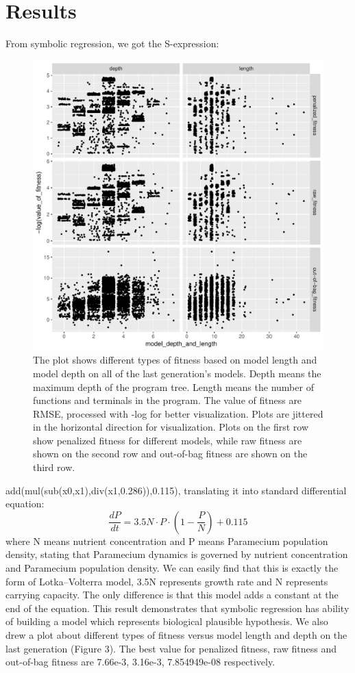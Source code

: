 \documentclass[11pt,a4paper]{article}
\begin{document}
\section{Results}
From symbolic regression, we got the S-expression:
\begin{figure}[h!]
\centering
\includegraphics[scale = 0.6]{../Results/model_fitness.pdf}
\caption{The plot shows different types of fitness based on model length and model depth on all of the last generation's models. Depth means the maximum depth of the program tree. Length means the number of functions and terminals in the program. The value of fitness are RMSE, processed with -log for better visualization. Plots are jittered in the horizontal direction for visualization. Plots on the first row show penalized fitness for different models, while raw fitness are shown on the second row and out-of-bag fitness are shown on the third row. }
\end{figure}
add(mul(sub(x0,x1),div(x1,0.286)),0.115), translating it into standard differential equation:
\begin{equation}
    \frac{dP}{dt} = 3.5N \cdot P \cdot (1- \frac{P}{N}) + 0.115
\end{equation}
where N means nutrient concentration and P means Paramecium population density, stating that Paramecium dynamics is governed by nutrient concentration and Paramecium population density. We can easily find that this is exactly the form of Lotka–Volterra model, 3.5N represents growth rate and N represents carrying capacity. The only difference is that this model adds a constant at the end of the equation. This result demonstrates that symbolic regression has ability of building a model which represents biological plausible hypothesis. We also drew a plot about different types of fitness versus model length and depth on the last generation (Figure 3).  The best value for penalized fitness, raw fitness and out-of-bag fitness are 7.66e-3, 3.16e-3, 7.854949e-08 respectively. 
\end{document}
